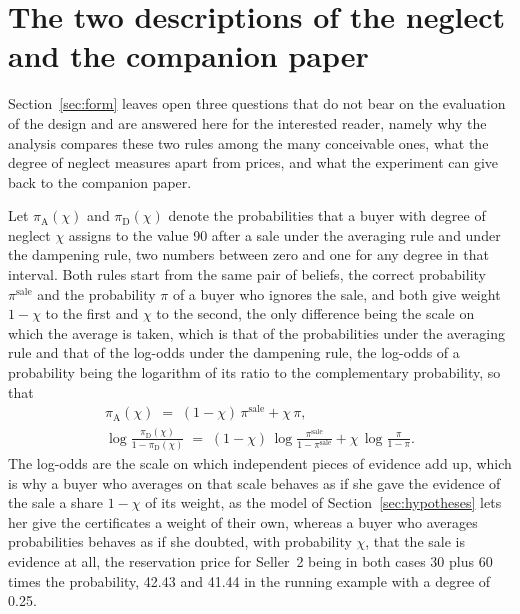 \documentclass[11pt,a4paper]{article}
\newcommand{\psale}{\pi^{\mathrm{sale}}}
\begin{document}
\section{The two descriptions of the neglect and the companion paper}\label{sec:rules}

Section~\ref{sec:form} leaves open three questions that do not bear on the evaluation of the design and are answered here for the interested reader, namely why the analysis compares these two rules among the many conceivable ones, what the degree of neglect measures apart from prices, and what the experiment can give back to the companion paper.

Let $\pi_{\mathrm{A}}(\chi)$ and $\pi_{\mathrm{D}}(\chi)$ denote the probabilities that a buyer with degree of neglect $\chi$ assigns to the value 90 after a sale under the averaging rule and under the dampening rule, two numbers between zero and one for any degree in that interval. Both rules start from the same pair of beliefs, the correct probability $\psale$ and the probability $\pi$ of a buyer who ignores the sale, and both give weight $1-\chi$ to the first and $\chi$ to the second, the only difference being the scale on which the average is taken, which is that of the probabilities under the averaging rule and that of the log-odds under the dampening rule, the log-odds of a probability being the logarithm of its ratio to the complementary probability, so that
\begin{gather*}
\pi_{\mathrm{A}}(\chi)\;=\;(1-\chi)\,\psale+\chi\,\pi,\\[2pt]
\log\frac{\pi_{\mathrm{D}}(\chi)}{1-\pi_{\mathrm{D}}(\chi)}\;=\;(1-\chi)\,\log\frac{\psale}{1-\psale}+\chi\,\log\frac{\pi}{1-\pi}.
\end{gather*}
The log-odds are the scale on which independent pieces of evidence add up, which is why a buyer who averages on that scale behaves as if she gave the evidence of the sale a share $1-\chi$ of its weight, as the model of Section~\ref{sec:hypotheses} lets her give the certificates a weight of their own, whereas a buyer who averages probabilities behaves as if she doubted, with probability $\chi$, that the sale is evidence at all, the reservation price for Seller~2 being in both cases 30 plus 60 times the probability, 42.43 and 41.44 in the running example with a degree of 0.25.
\end{document}
